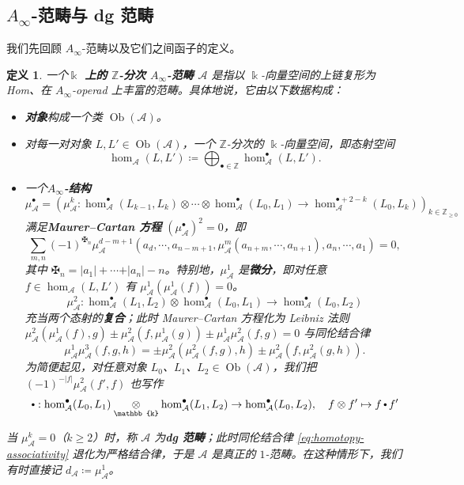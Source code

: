 \documentclass[11pt,a4paper]{article}
\renewcommand{\emph}[1]{{\bfseries #1}}
\DeclareMathOperator{\Ob}{Ob}
\DeclareMathOperator{\field}{\mathbb{k}}
\DeclareMathOperator{\comp}{\vcenter{\hbox{\scalebox{0.65}{$\bullet$}}}}
\theoremstyle{cnth}
\newtheorem{dfn}[thm]{定义}
\begin{document}
\subsection{$A_{\infty}$-范畴与 dg 范畴}
我们先回顾 $A_{\infty}$-范畴以及它们之间函子的定义。
\begin{dfn}
一个\emph{$\field$ 上的 $\mathbb{Z}$-分次 $A_{\infty}$-范畴 $\mathcal{A}$} 是指以 $\field$-向量空间的上链复形为 Hom、在 $A_{\infty}$-operad 上丰富的范畴。具体地说，它由以下数据构成：
\begin{itemize}
\item
\emph{对象}构成一个类 $\Ob(\mathcal{A})$。
\item 对每一对对象 $L,L'\in\Ob (\mathcal{A})$，一个 $\mathbb{Z}$-分次的 $\field$-向量空间，即态射空间
$$
\hom_{\mathcal{A}}(L,L')\coloneqq \bigoplus_{\bullet\in\mathbb{Z}} \hom_{\mathcal{A}}^{\bullet}(L,L').
$$
\item 一个\emph{$A_{\infty}$-结构} \[
    \mu_{\mathcal{A}}^{\bullet} =\left(\mu_{\mathcal{A}}^k\colon\hom_{\mathcal{A}}^{\bullet} (L_{k-1},L_k)\otimes\dotsb\otimes\hom_{\mathcal{A}}^{\bullet} (L_0, L_1)\to\hom_{\mathcal{A}}^{\bullet +2-k} (L_0, L_k)\right)_{k\in\mathbb{Z}_{\geq 0}}
\] 满足\emph{Maurer--Cartan 方程} $(\mu_{\mathcal{A}}^{\bullet})^2=0$，即 \[
    \sum_{m,n}(-1)^{\maltese_n}\mu_{\mathcal{A}}^{d-m+1} (a_d,\dotsb, a_{n-m+1},\mu_{\mathcal{A}}^m (a_{n+m},\dotsb, a_{n+1}),a_n,\dotsb, a_1)=0,
\] 其中 $\maltese_n =\vert a_1\vert+\dotsb+\vert a_n\vert -n$。特别地，$\mu_{\mathcal{A}}^1$ 是\emph{微分}，即对任意 $f\in\hom_{\mathcal{A}}(L,L')$ 有 $\mu_{\mathcal{A}}^1(\mu_{\mathcal{A}}^1(f))=0$。\[
\mu_{\mathcal{A}}^2\colon\hom_{\mathcal{A}}^{\bullet} (L_1,L_2)\otimes\hom_{\mathcal{A}}^{\bullet} (L_0,L_1)\to\hom_{\mathcal{A}}^{\bullet} (L_0, L_2)
\] 充当两个态射的\emph{复合}；此时 Maurer--Cartan 方程化为 Leibniz 法则 $\mu_{\mathcal{A}}^2 (\mu_{\mathcal{A}}^1 (f),g)\pm\mu_{\mathcal{A}}^2 (f,\mu_{\mathcal{A}}^1 (g))\pm\mu_{\mathcal{A}}^1\mu_{\mathcal{A}}^2 (f,g)=0$ 与同伦结合律 \begin{equation}\label{eq:homotopy-associativity}
\mu^1_{\mathcal{A}}\mu_{\mathcal{A}}^3 (f,g,h)=\pm\mu_{\mathcal{A}}^2 (\mu_{\mathcal{A}}^2 (f,g),h)\pm\mu_{\mathcal{A}}^2 (f,\mu_{\mathcal{A}}^2 (g,h)).
\end{equation}
为简便起见，对任意对象 $L_0$、$L_1$、$L_2\in\Ob(\mathcal{A})$，我们把 $(-1)^{-\vert f\vert}\mu_{\mathcal{A}}^2 (f',f)$ 也写作
$$
\comp
:
\hom_{\mathcal{A}}^{\bullet}(L_0,L_1)\underset{\field}{\otimes}\hom_{\mathcal{A}}^{\bullet}(L_1,L_2)
\rightarrow
\hom_{\mathcal{A}}^{\bullet}(L_0,L_2),
\quad
f\otimes f'
\mapsto
f\comp f'
$$
\end{itemize}
当 $\mu_{\mathcal{A}}^k=0$（$k\geq 2$）时，称 $\mathcal{A}$ 为\emph{dg 范畴}；此时同伦结合律 \eqref{eq:homotopy-associativity} 退化为严格结合律，于是 $\mathcal{A}$ 是真正的 $1$-范畴。在这种情形下，我们有时直接记 $d_{\mathcal{A}}\coloneqq\mu_{\mathcal{A}}^1$。
\end{dfn}
\end{document}
